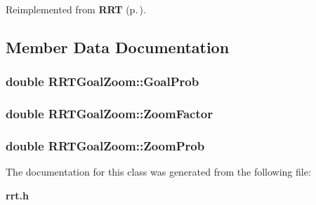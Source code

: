 Reimplemented from {\bf RRT} {\rm (p.\,\pageref{class_RRT_b4})}.

\subsection{Member Data Documentation}
\subsubsection{\setlength{\rightskip}{0pt plus 5cm}double RRTGoal\-Zoom::Goal\-Prob}\label{class_RRTGoalZoom_m0}


\subsubsection{\setlength{\rightskip}{0pt plus 5cm}double RRTGoal\-Zoom::Zoom\-Factor}\label{class_RRTGoalZoom_m2}


\subsubsection{\setlength{\rightskip}{0pt plus 5cm}double RRTGoal\-Zoom::Zoom\-Prob}\label{class_RRTGoalZoom_m1}




The documentation for this class was generated from the following file:\begin{CompactItemize}
\item 
{\bf rrt.h}\end{CompactItemize}
